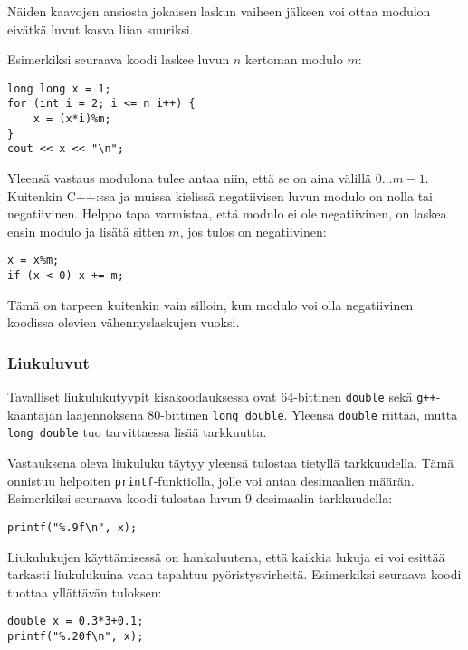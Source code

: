 Näiden kaavojen ansiosta
jokaisen laskun vaiheen jälkeen voi ottaa modulon
eivätkä luvut kasva liian suuriksi.

Esimerkiksi seuraava koodi
laskee luvun $n$ kertoman modulo $m$:

\begin{lstlisting}
long long x = 1;
for (int i = 2; i <= n i++) {
    x = (x*i)%m;
}
cout << x << "\n";
\end{lstlisting}

Yleensä vastaus modulona tulee antaa niin,
että se on aina välillä $0\ldots m-1$.
Kuitenkin C++:ssa ja muissa
kielissä negatiivisen
luvun modulo on nolla tai negatiivinen.
Helppo tapa varmistaa, että modulo ei ole negatiivinen,
on laskea ensin modulo ja lisätä sitten $m$,
jos tulos on negatiivinen:

\begin{lstlisting}
x = x%m;
if (x < 0) x += m;
\end{lstlisting}
Tämä on tarpeen kuitenkin vain silloin,
kun modulo voi olla negatiivinen
koodissa olevien vähennyslaskujen vuoksi.

\subsubsection{Liukuluvut}


Tavalliset liukulukutyypit kisakoodauksessa
ovat 64-bittinen \texttt{double}
sekä \texttt{g++}-kääntäjän
laajennoksena
80-bittinen \texttt{long double}.
Yleensä \texttt{double} riittää,
mutta \texttt{long double} tuo tarvittaessa
lisää tarkkuutta.

Vastauksena oleva liukuluku täytyy yleensä tulostaa
tietyllä tarkkuudella.
Tämä onnistuu helpoiten \texttt{printf}-funktiolla,
jolle voi antaa desimaalien määrän.
Esimerkiksi seuraava koodi tulostaa luvun 9
desimaalin tarkkuudella:

\begin{lstlisting}
printf("%.9f\n", x);
\end{lstlisting}

Liukulukujen käyttämisessä on hankaluutena,
että kaikkia lukuja ei voi esittää tarkasti
liukulukuina vaan tapahtuu pyöristysvirheitä.
Esimerkiksi seuraava koodi tuottaa yllättävän tuloksen:

\begin{lstlisting}
double x = 0.3*3+0.1;
printf("%.20f\n", x);
\end{lstlisting}

